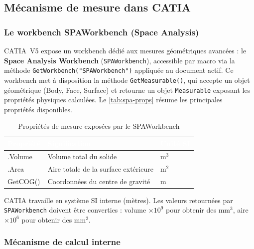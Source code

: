 \subsection{Mécanisme de mesure dans CATIA}

\subsubsection{Le workbench SPAWorkbench (Space Analysis)}

CATIA~V5 expose un workbench dédié aux mesures géométriques avancées : le \textbf{Space Analysis Workbench} (\texttt{SPAWorkbench}), accessible par macro via la méthode \texttt{GetWorkbench("SPAWorkbench")} appliquée au document actif. Ce workbench met à disposition la méthode \texttt{GetMeasurable()}, qui accepte un objet géométrique (Body, Face, Surface) et retourne un objet \texttt{Measurable} exposant les propriétés physiques calculées. Le \autoref{tab:spa-props} résume les principales propriétés disponibles.

\begin{table}[H]
    \centering
    \caption{Propriétés de mesure exposées par le SPAWorkbench}
    \label{tab:spa-props}
    \begin{tabularx}{\textwidth}{|>{\ttfamily\raggedright\arraybackslash}p{3.5cm}|X|>{\centering\arraybackslash}p{2.5cm}|}
        \hline
        \rowcolor{headerblue}
        \normalfont\textcolor{white}{\textbf{Propriété}} & \centering\textcolor{white}{\textbf{Signification}} & \textcolor{white}{\textbf{Unité SI}} \tabularnewline
        \hline
        \rowcolor{rowlight}
        .Volume & Volume total du solide & m$^{3}$ \\
        \hline
        \rowcolor{rowwhite}
        .Area & Aire totale de la surface extérieure & m$^{2}$ \\
        \hline
        \rowcolor{rowlight}
        GetCOG() & Coordonnées du centre de gravité & m \\
        \hline
    \end{tabularx}
\end{table}

\begin{block}[note]
CATIA travaille en système SI interne (mètres). Les valeurs retournées par \texttt{SPAWorkbench} doivent être converties : volume $\times 10^{9}$ pour obtenir des mm$^{3}$, aire $\times 10^{6}$ pour obtenir des mm$^{2}$.
\end{block}

\subsubsection{Mécanisme de calcul interne}

